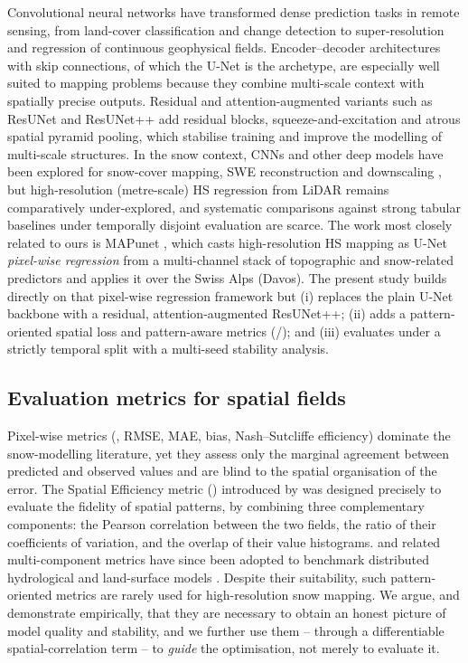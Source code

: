Convolutional neural networks have transformed dense prediction tasks in
remote sensing, from land-cover classification and change detection
\citep{daudt2018} to super-resolution and regression of continuous
geophysical fields. Encoder--decoder architectures with skip connections, of
which the U-Net \citep{ronneberger2015} is the archetype, are especially
well suited to mapping problems because they combine multi-scale context with
spatially precise outputs. Residual and attention-augmented variants such as
ResUNet \citep{zhang2018} and ResUNet++ \citep{jha2019} add residual blocks,
squeeze-and-excitation and atrous spatial pyramid pooling, which stabilise
training and improve the modelling of multi-scale structures. In the snow
context, CNNs and other deep models have been explored for snow-cover
mapping, SWE reconstruction and downscaling
\citep{king2020,mital2022}, but high-resolution (metre-scale) HS regression
from LiDAR remains comparatively under-explored, and systematic comparisons
against strong tabular baselines under temporally disjoint evaluation are
scarce. The work most closely related to ours is MAPunet \citep{betato2025mapunet},
which casts high-resolution HS mapping as U-Net \emph{pixel-wise regression}
from a multi-channel stack of topographic and snow-related predictors and
applies it over the Swiss Alps (Davos). The present study builds directly on
that pixel-wise regression framework but (i) replaces the plain U-Net backbone
with a residual, attention-augmented ResUNet++; (ii) adds a pattern-oriented
spatial loss and pattern-aware metrics (\SPAEF{}/\MSPAEF{}); and (iii) evaluates
under a strictly temporal split with a multi-seed stability analysis.

\subsection{Evaluation metrics for spatial fields}

Pixel-wise metrics (\Rsq{}, RMSE, MAE, bias, Nash--Sutcliffe efficiency)
dominate the snow-modelling literature, yet they assess only the marginal
agreement between predicted and observed values and are blind to the spatial
organisation of the error. The Spatial Efficiency metric (\SPAEF{})
introduced by \citet{koch2018} was designed precisely to evaluate the fidelity
of spatial patterns, by combining three complementary components: the Pearson
correlation between the two fields, the ratio of their coefficients of
variation, and the overlap of their value histograms. \SPAEF{} and related
multi-component metrics have since been adopted to benchmark distributed
hydrological and land-surface models \citep{koch2018,demirel2018}. Despite
their suitability, such pattern-oriented metrics are rarely used for
high-resolution snow mapping. We argue, and demonstrate empirically, that they
are necessary to obtain an honest picture of model quality and stability, and
we further use them -- through a differentiable spatial-correlation term -- to
\emph{guide} the optimisation, not merely to evaluate it.

